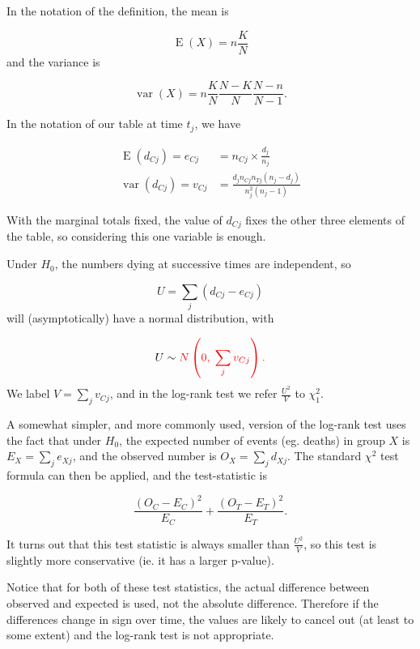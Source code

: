 \documentclass[
  openany]{book}
\theoremstyle{definition}
\theoremstyle{definition}
\theoremstyle{definition}
\theoremstyle{definition}
\theoremstyle{remark}
\begin{document}
In the notation of the definition, the mean is

\[\operatorname{E}\left(X\right)= n\frac{K}{N} \]
and the variance is

\[\operatorname{var}\left(X\right) = n\frac{K}{N}\frac{N-K}{N}\frac{N-n}{N-1}.\]

In the notation of our table at time \(t_j\), we have

\begin{align*}
\operatorname{E}\left(d_{Cj}\right) = e_{Cj} & = n_{Cj}\times{\frac{d_j}{n_j}}\\
\operatorname{var}\left(d_{Cj}\right) = v_{Cj} &= \frac{d_j n_{Cj}n_{Tj} \left(n_j-d_j\right)}{n_j^2\left(n_j-1\right)}
\end{align*}

With the marginal totals fixed, the value of \(d_{Cj}\) fixes the other three elements of the table, so considering this one variable is enough.

Under \(H_0\), the numbers dying at successive times are independent, so

\[U = \sum\limits_{j}\left(d_{Cj}-e_{Cj}\right) \]
will (asymptotically) have a normal distribution, with

\[U \sim \color{red}{N}\left(0,\;\sum\limits_j v_{Cj}\right). \]
We label \(V = \sum\limits_jv_{Cj}\), and in the log-rank test we refer \(\frac{U^2}{V}\) to \(\chi^2_1\).

A somewhat simpler, and more commonly used, version of the log-rank test uses the fact that under \(H_0\), the expected number of events (eg. deaths) in group \(X\) is \(E_X = \sum\limits_je_{Xj}\), and the observed number is \(O_X = \sum\limits_j d_{Xj}\). The standard \(\chi^2\) test formula can then be applied, and the test-statistic is

\[\frac{\left(O_C - E_C\right)^2}{E_C} + \frac{\left(O_T - E_T\right)^2}{E_T}.\]

It turns out that this test statistic is always smaller than \(\frac{U^2}{V}\), so this test is slightly more conservative (ie. it has a larger p-value).

Notice that for both of these test statistics, the actual difference between observed and expected is used, not the absolute difference. Therefore if the differences change in sign over time, the values are likely to cancel out (at least to some extent) and the log-rank test is not appropriate.
\end{document}

